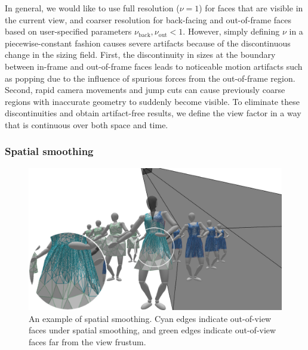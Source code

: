 \documentclass[10pt,journal,compsoc,twoside]{TexInputs/IEEEtran}
\begin{document}
In general, we would like to use full resolution ($\nu=1$) for faces that are visible
in the current view, and coarser resolution for back-facing and out-of-frame faces based on user-specified parameters $\nu_{\text{back}}, \nu_{\text{out}} < 1$.
However, simply defining $\nu$ in a piecewise-constant
fashion causes severe artifacts because of the discontinuous change in the sizing
field.
First, the discontinuity in sizes at the boundary between in-frame and out-of-frame faces leads to noticeable motion artifacts such as popping due to the influence of spurious forces from the out-of-frame region.
Second, rapid camera movements and jump cuts can cause previously coarse regions with inaccurate geometry to suddenly become visible.
To
eliminate these discontinuities and obtain artifact-free results, we define the
view factor in a way that is continuous over both space and time.

\subsubsection{Spatial smoothing}

\begin{figure}[t]
    \centering
    \includegraphics[width=1.0\columnwidth]{spatial_smoothing/spatial_smoothing}
    \caption{An example of spatial smoothing. Cyan edges indicate out-of-view faces
    under spatial smoothing, and green edges indicate out-of-view faces far from the view frustum.}
    \label{fig:spatial_smoothing}
\end{figure}
\end{document}
